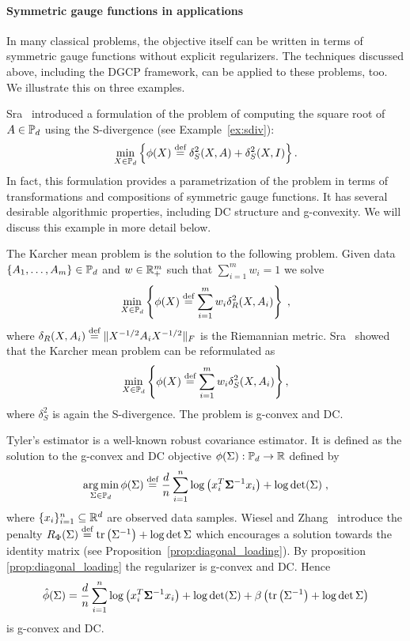 \documentclass[sn-nature]{sn-jnl}%
\theoremstyle{thmstyleone}%
\theoremstyle{thmstyletwo}%
\theoremstyle{thmstylethree}%
\begin{document}
\paragraph{Symmetric gauge functions in applications}
In many classical problems, the objective itself can be written  in terms of symmetric gauge functions without explicit regularizers. The techniques discussed above, including the DGCP framework, can be applied to these problems, too. We illustrate this on three examples.


\begin{example}\label{ex:sqrt}
     Sra~\cite{sra2015matrixsquareroot} introduced a formulation of the problem of
     computing the square root of $A \in \mathbb{P}_d$ using the S-divergence (see Example~\ref{ex:sdiv}):
      \[
        \min _{X \in \mathbb{P}_d} \left\{\phi(X) \stackrel{\text{def}}{=} \delta_S^2(X, A)+\delta_S^2(X, I) \right\}.
    \]
     In fact, this formulation provides a parametrization of the problem in terms of transformations and compositions of symmetric gauge functions.
     It has several desirable algorithmic properties, including DC structure and g-convexity. We will discuss this example in more detail below.
\end{example}

\begin{example}\label{ex:karcher}
The Karcher mean problem \cite{pmlr-v202-weber23a} is the solution to the following problem.
Given data $\{A_1, \ldots, A_m\} \in \mathbb{P}_d$ and $w \in \mathbb{R}^m_+$ such that $\sum_{i=1}^m w_i = 1$ we solve
\[
\min_{X \in \mathbb{P}_d} \left\{\phi(X) \stackrel{\text{def}}{=} \sum_{i=1}^m w_i \delta_R^2(X,A_i)\right\} \; ,
\]
where $\delta_R(X,A_i) \stackrel{\text{def}}{=} \| X^{-1/2}A_i X^{-1/2}\|_F$ is the Riemannian metric.
Sra~\cite{sra2013sdivergence} showed that the Karcher mean problem can be reformulated as
\[
\min_{X \in \mathbb{P}_d} \left\{\phi(X) \stackrel{\text{def}}{=} \sum_{i=1}^m w_i \delta_S^2(X, A_i) \right\},
\]
where $\delta_S^2$ is again the S-divergence. The problem is g-convex and DC.
\end{example}

\begin{example}\label{example:tyler_estimator_diagonal_loading}
    Tyler's estimator \cite{tyler1987distribution} is a well-known robust covariance estimator. It is defined as the solution to the g-convex and DC  objective $\phi(\Sigma): \mathbb{P}_d \to \mathbb{R}$ defined by
    \[
    \operatorname*{arg\,min}_{\Sigma \in \mathbb{P}_d}\phi(\Sigma) \stackrel{\text{def}}{=} \frac{d}{n} \sum_{i=1}^n \log \left(x_i^T \mathbf{\Sigma}^{-1} x_i\right)+\log \det(\Sigma) \; ,
    \]
where $\{x_i\}_{i=1}^n \subseteq \mathbb{R}^d$ are observed data samples. Wiesel and Zhang~\cite{structuredcovestimation_wiesel} introduce the penalty $R_\Phi(\Sigma) \stackrel{\text{def}}{=} \text{tr} \left(\Sigma^{-1}\right)  + \log \det \Sigma$ which encourages a solution towards the identity matrix (see Proposition~\ref{prop:diagonal_loading}). By proposition \ref{prop:diagonal_loading} the regularizer is g-convex and DC. Hence
\[
\hat{\phi}(\Sigma) = \frac{d}{n} \sum_{i=1}^n \log \left(x_i^T \mathbf{\Sigma}^{-1} x_i\right)+\log \det(\Sigma) + \beta \left( \text{tr} \left(\Sigma^{-1}\right) + \log \det \Sigma \right)
\]
is g-convex and DC.
\end{example}
\end{document}
